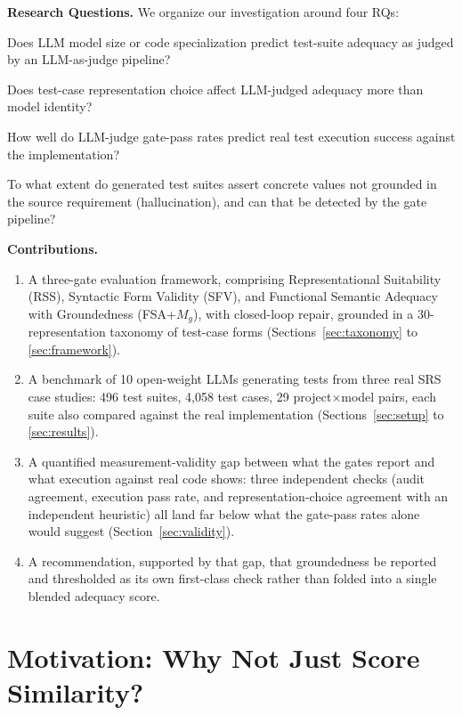 \documentclass[conference]{IEEEtran}
\begin{document}
  \textbf{Research Questions.} We organize our investigation around four RQs:
  \begin{description}[leftmargin=0pt]
  \item[\textbf{RQ1}] Does LLM model size or code specialization predict test-suite adequacy as judged by an LLM-as-judge pipeline?
  \item[\textbf{RQ2}] Does test-case representation choice affect LLM-judged adequacy more than model identity?
  \item[\textbf{RQ3}] How well do LLM-judge gate-pass rates predict real test execution success against the implementation?
  \item[\textbf{RQ4}] To what extent do generated test suites assert concrete values not grounded in the source requirement (hallucination), and can that be detected by the gate pipeline?
  \end{description}
  \textbf{Contributions.}
  \begin{enumerate}
  \item A three-gate evaluation framework, comprising Representational
  Suitability (RSS), Syntactic Form Validity (SFV), and Functional Semantic
  Adequacy with Groundedness (FSA+$M_g$), with closed-loop repair, grounded in a
  30-representation taxonomy of test-case forms (Sections~\ref{sec:taxonomy}
  to \ref{sec:framework}).
  \item A benchmark of 10 open-weight LLMs generating tests from three real SRS
  case studies: 496 test suites, 4{,}058 test cases, 29 project$\times$model
  pairs, each suite also compared against the real implementation
  (Sections~\ref{sec:setup} to \ref{sec:results}).
  \item A quantified measurement-validity gap between what the gates report and
  what execution against real code shows: three independent checks (audit
  agreement, execution pass rate, and representation-choice agreement with an
  independent heuristic) all land far below what the gate-pass rates alone would
  suggest (Section~\ref{sec:validity}).
  \item A recommendation, supported by that gap, that groundedness be reported
  and thresholded as its own first-class check rather than folded into a single
  blended adequacy score.
  \end{enumerate}

  \section{Motivation: Why Not Just Score Similarity?}
  \label{sec:motivation}
\end{document}
